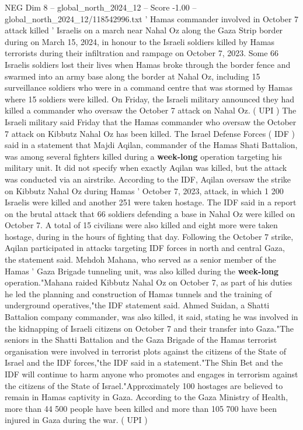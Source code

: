 \begin{textsample}{NEG Dim 8 – global\_north\_2024\_12 – Score -1.00 – global\_north\_2024\_12/118542996.txt}  \label{ex:f8_neg_353}
' Hamas commander involved in October 7 attack killed ' Israelis on a march near Nahal Oz along the Gaza Strip border during on March 15, 2024, in honour to the Israeli soldiers killed by Hamas terrorists during their infiltration and rampage on October 7, 2023.
Some 66 Israelis soldiers lost their lives when Hamas broke through the border fence and swarmed into an army base along the border at Nahal Oz, including 15 surveillance soldiers who were in a command centre that was stormed by Hamas where 15 soldiers were killed.
On Friday, the Israeli military announced they had killed a commander who oversaw the October 7 attack on Nahal Oz. ( UPI ) The Israeli military said Friday that the Hamas commander who oversaw the October 7 attack on Kibbutz Nahal Oz has been killed.
The Israel Defense Forces ( IDF ) said in a statement that Majdi Aqilan, commander of the Hamas Shati Battalion, was among several fighters killed during a \textbf{week-long} operation targeting his military unit.
It did not specify when exactly Aqilan was killed, but the attack was conducted via an airstrike.
According to the IDF, Aqilan oversaw the strike on Kibbutz Nahal Oz during Hamas ' October 7, 2023, attack, in which 1 200 Israelis were killed and another 251 were taken hostage.
The IDF said in a report on the brutal attack that 66 soldiers defending a base in Nahal Oz were killed on October 7.
A total of 15 civilians were also killed and eight more were taken hostage, during in the hours of fighting that day.
Following the October 7 strike, Aqilan participated in attacks targeting IDF forces in north and central Gaza, the statement said.
Mehdoh Mahana, who served as a senior member of the Hamas ' Gaza Brigade tunneling unit, was also killed during the \textbf{week-long} operation."Mahana raided Kibbutz Nahal Oz on October 7, as part of his duties he led the planning and construction of Hamas tunnels and the training of underground operatives,"the IDF statement said.
Ahmed Suidan, a Shatti Battalion company commander, was also killed, it said, stating he was involved in the kidnapping of Israeli citizens on October 7 and their transfer into Gaza."The seniors in the Shatti Battalion and the Gaza Brigade of the Hamas terrorist organisation were involved in terrorist plots against the citizens of the State of Israel and the IDF forces,"the IDF said in a statement."The Shin Bet and the IDF will continue to harm anyone who promotes and engages in terrorism against the citizens of the State of Israel."Approximately 100 hostages are believed to remain in Hamas captivity in Gaza.
According to the Gaza Ministry of Health, more than 44 500 people have been killed and more than 105 700 have been injured in Gaza during the war. ( UPI )

\end{textsample}
